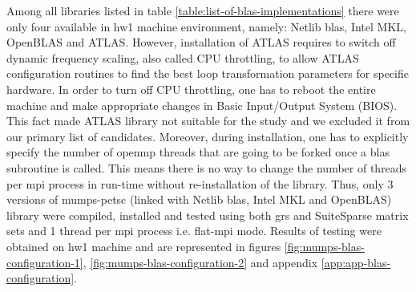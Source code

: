 Among all libraries listed in table \ref{table:list-of-blas-implementations} there were only four available in \gls{hw1} machine environment, namely: Netlib \acrshort{blas}, Intel MKL, OpenBLAS and ATLAS. However, installation of ATLAS requires to switch off dynamic frequency scaling, also called CPU throttling, to allow ATLAS configuration routines to find the best loop transformation parameters for specific hardware. In order to turn off CPU throttling, one has to reboot the entire machine and make appropriate changes in Basic Input/Output System (BIOS). This fact made ATLAS library not suitable for the study and we excluded it from our primary list of candidates. Moreover, during installation, one has to explicitly specify the number of \acrshort{openmp} threads that are going to be forked once a \acrshort{blas} subroutine is called. This means there is no way to change the number of threads per \acrshort{mpi} process in run-time without re-installation of the library. Thus, only 3 versions of \acrshort{mumps}-\acrshort{petsc} (linked with Netlib \acrshort{blas}, Intel MKL and OpenBLAS) library were compiled, installed and tested using both \acrshort{grs} and SuiteSparse matrix sets and 1 thread per \acrshort{mpi} process i.e. flat-\acrshort{mpi} mode. Results of testing were obtained on \gls{hw1} machine and are represented in figures \ref{fig:mumps-blas-configuration-1}, \ref{fig:mumps-blas-configuration-2} and appendix \ref{app:app-blas-configuration}.\\


